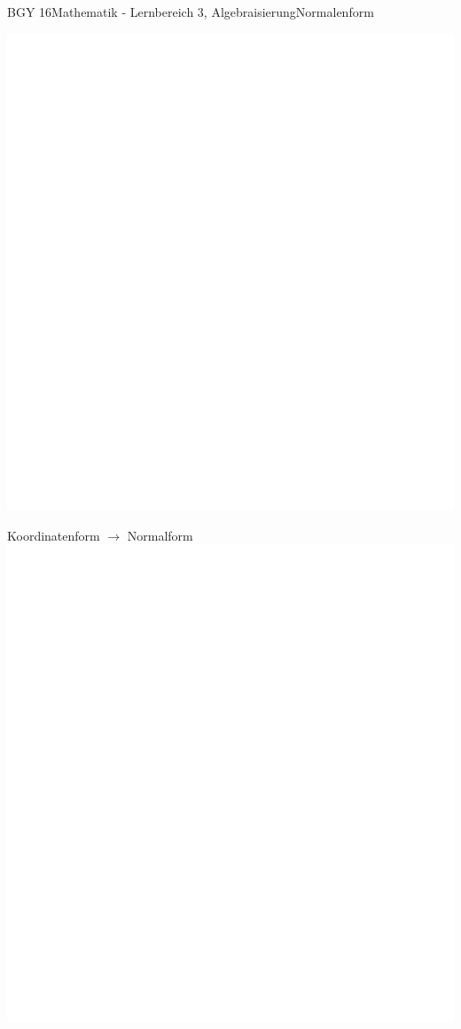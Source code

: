 \documentclass[oneside,openany,headings=optiontotoc,11pt,numbers=noenddot]{scrreprt}
\begin{document}
\begin{worksheet}{BGY 16}{Mathematik - Lernbereich 3, Algebraisierung}{Normalenform}
\begin{framed}
			\includegraphics[scale=0.3]{../empty.jpg}\\
		\end{framed}
		\begin{framed}
			\tiny{\color{codegray}Koordinatenform \(\rightarrow\) Normalform}\\
			\includegraphics[scale=0.3]{../empty.jpg}

\end{framed}
\end{worksheet}
\end{document}

